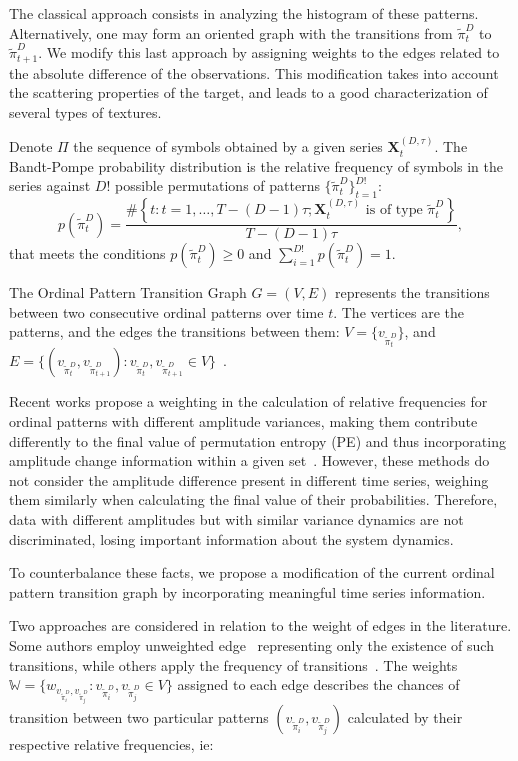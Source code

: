 \documentclass[paper=letter, fontsize=12pt]{article}
\begin{document}
The classical approach consists in analyzing the histogram of these patterns.
Alternatively, one may form an oriented graph with the transitions from $\widetilde\pi_t^D$ to $\widetilde\pi_{t+1}^D$.
We modify this last approach by assigning weights to the edges related to the absolute difference of the observations.
This modification takes into account the scattering properties of the target, and leads to a good characterization of several types of textures.

Denote $\Pi$ the sequence of symbols obtained by a given series $\mathbf{X}_t^{(D,\tau)}$.
The Bandt-Pompe probability distribution is the relative frequency of symbols in the series against $D!$ possible permutations of patterns $\{\widetilde\pi_t^D \}_{t = 1}^{D!}$:
\begin{equation}
p(\widetilde\pi_t^D) = \frac{\#\left \{t : t = 1, \dots, T-(D-1)\tau; \mathbf{X}_t^{(D,\tau)} \text{ is of type } \widetilde\pi_t^D\right \}}{T- (D-1)\tau},  
\end{equation}
that meets the conditions $p(\widetilde\pi_t^D) \ge 0$ and  $\sum_{i=1}^{D!} p(\widetilde\pi_t^D) = 1$.

The Ordinal Pattern Transition Graph ${G} = ({V}, {E})$ 
represents the transitions between two consecutive ordinal patterns over time $t$.
The vertices are the patterns, and the edges the transitions between them:
$V = \{v_{\widetilde\pi_t^D}\}$, and 
$E = \{(v_{\widetilde\pi_t^D}, v_{\widetilde\pi_{t+1}^D}): v_{\widetilde\pi_t^D}, v_{\widetilde\pi_{t+1}^D} \in V \}$~\cite{LearningandDistinguishingTimeSeriesDynamicsViaOrdinalPatternsTransitionGraphs2019}.

Recent works propose a weighting in the calculation of relative frequencies for ordinal patterns with different amplitude variances, making them contribute differently to the final value of permutation entropy (PE) and thus incorporating amplitude change information within a given set~\cite{Fadlallah2013Weightedpermutation}.
However, these methods do not consider the amplitude difference present in different time series, weighing them similarly when calculating the final value of their probabilities.
Therefore, data with different amplitudes but with similar variance dynamics are not discriminated, losing important information about the system dynamics.

To counterbalance these facts, we propose a modification of the current ordinal pattern transition graph by incorporating meaningful time series information.

Two approaches are considered in relation to the weight of edges in the literature.
Some authors employ unweighted edge~\cite{McCullough2015lagged,Kulp2016ordinal} representing only the existence of such transitions, while others apply the frequency of transitions~\cite{Sorrentino2015periodic,Zhang2017ConstructingOP}.
The weights $\mathbb{W} = \{w_{v_{\widetilde{\pi}^D_i}, v_{\widetilde\pi^D_j}}: v_{\widetilde\pi^D_i}, v_{\widetilde\pi^D_j} \in V \}$ assigned to each edge describes the chances of transition between two particular patterns $(v_{\widetilde\pi^D_i}, v_{\widetilde\pi^D_j})$ calculated by their respective relative frequencies, ie:
\end{document}
